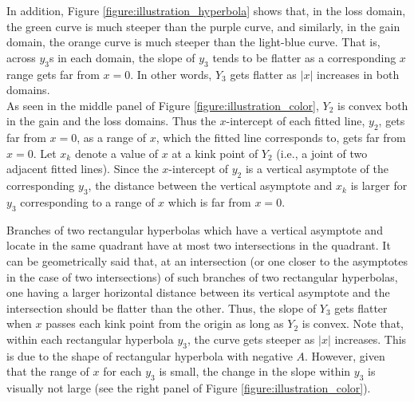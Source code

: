 \documentclass[11pt, a4paper]{article}
\begin{document}
In addition, Figure \ref{figure:illustration_hyperbola} shows that, in the loss domain, the green curve is much steeper than the purple curve, and similarly, in the gain domain, the orange curve is much steeper than the light-blue curve. That is, across $y_3$s in each domain, the slope of $y_3$ tends to be flatter as a corresponding $x$ range gets far from $x=0$.
In other words, $Y_3$ gets flatter as $|x|$ increases in both domains. \\

\noindent
As seen in the middle panel of Figure \ref{figure:illustration_color}, $Y_2$ is convex both in the gain and the loss domains. Thus the $x$-intercept of each fitted line, $y_2$, gets far from $x=0$, as a range of $x$, which the fitted line corresponds to, gets far from $x=0$. 
Let $x_k$ denote a value of $x$ at a kink point of $Y_2$ (i.e., a joint of two adjacent fitted lines).
Since the $x$-intercept of $y_2$ is a vertical asymptote of the corresponding $y_3$, the distance between the vertical asymptote and $x_k$ is larger for $y_3$ corresponding to a range of $x$ which is far from $x=0$. 
 
Branches of two rectangular hyperbolas which have a vertical asymptote and locate in the same quadrant have at most two intersections in the quadrant. 
It can be geometrically said that, at an intersection (or one closer to the asymptotes in the case of two intersections) of such branches of two rectangular hyperbolas, one having a larger horizontal distance between its vertical asymptote and the intersection should be flatter than the other. Thus, the slope of $Y_3$ gets flatter when $x$ passes each kink point from the origin as long as $Y_2$ is convex.
Note that, within each rectangular hyperbola $y_3$, the curve gets steeper as $|x|$ increases. This is due to the shape of rectangular hyperbola with negative $A$. However, given that the range of $x$ for each $y_3$ is small, the change in the slope within $y_3$ is visually not large (see the right panel of Figure \ref{figure:illustration_color}).\\    
\end{document}
